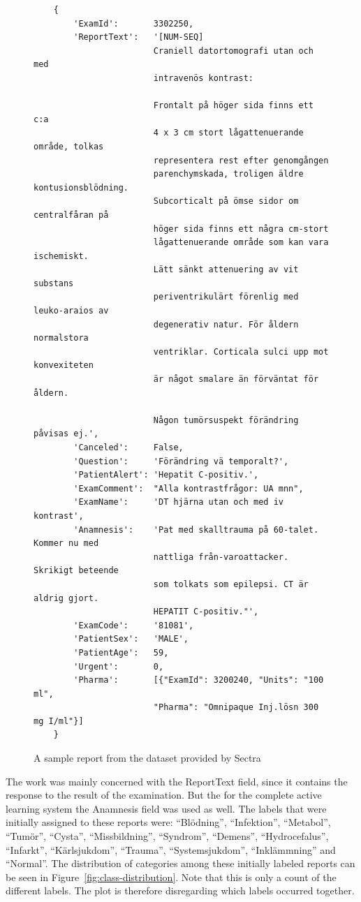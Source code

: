 \begin{figure}
\begin{verbatim}
    {
        'ExamId':       3302250, 
        'ReportText':   '[NUM-SEQ] 
                        Craniell datortomografi utan och med 
                        intravenös kontrast:
                        
                        Frontalt på höger sida finns ett c:a 
                        4 x 3 cm stort lågattenuerande område, tolkas 
                        representera rest efter genomgången 
                        parenchymskada, troligen äldre kontusionsblödning. 
                        Subcorticalt på ömse sidor om centralfåran på 
                        höger sida finns ett några cm-stort 
                        lågattenuerande område som kan vara ischemiskt. 
                        Lätt sänkt attenuering av vit substans 
                        periventrikulärt förenlig med leuko-araios av 
                        degenerativ natur. För åldern normalstora 
                        ventriklar. Corticala sulci upp mot konvexiteten 
                        är något smalare än förväntat för åldern. 
                        
                        Någon tumörsuspekt förändring påvisas ej.',
        'Canceled':     False, 
        'Question':     'Förändring vä temporalt?',
        'PatientAlert': 'Hepatit C-positiv.', 
        'ExamComment':  "Alla kontrastfrågor: UA mnn", 
        'ExamName':     'DT hjärna utan och med iv kontrast',
        'Anamnesis':    'Pat med skalltrauma på 60-talet. Kommer nu med 
                        nattliga från-varoattacker. Skrikigt beteende 
                        som tolkats som epilepsi. CT är aldrig gjort. 
                        HEPATIT C-positiv."',
        'ExamCode':     '81081', 
        'PatientSex':   'MALE', 
        'PatientAge':   59, 
        'Urgent':       0, 
        'Pharma':       [{"ExamId": 3200240, "Units": "100 ml", 
                        "Pharma": "Omnipaque Inj.lösn 300 mg I/ml"}]
    }
\end{verbatim}
\caption{A sample report from the dataset provided by Sectra}
\label{fig:sample-report}
\end{figure}

The work was mainly concerned with the ReportText field, since it contains the response to the result of the examination.
But the for the complete active learning system the Anamnesis field was used as well.
The labels that were initially assigned to these reports were:
``Blödning'', ``Infektion'', ``Metabol'', ``Tumör'', ``Cysta'', ``Missbildning'', ``Syndrom'', ``Demens'', ``Hydrocefalus'', ``Infarkt'', ``Kärlsjukdom'', ``Trauma'', ``Systemsjukdom'', ``Inklämmning'' and ``Normal''.
The distribution of categories among these initially labeled reports can be seen in Figure~\ref{fig:class-distribution}.
Note that this is only a count of the different labels.
The plot is therefore disregarding which labels occurred together.

